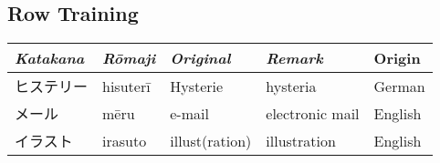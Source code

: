 \subsection{} \label{sec:KatakanaRa}

 

\subsection{} \label{sec:KatakanaRi}

 

\subsection{} \label{sec:KatakanaRu}

 

\subsection{} \label{sec:KatakanaRe}

 

\subsection{} \label{sec:KatakanaRa}

 

\subsection{ Row Training}
\Padding
\begin{longtable}[c]{p{2cm}p{1.5cm}p{2.5cm}p{3cm}p{6cm}}
\textit{Katakana}&\textit{Rōmaji}&\textit{Original}&\textit{Remark}&Origin\\\hline
ヒステリー  &hisuterī  &Hysterie      &hysteria               &German\\
メール      &mēru      &e-mail        &electronic mail        &English\\
イラスト    &irasuto   &illust(ration)&illustration           &English\\
\end{longtable}
\Padding

